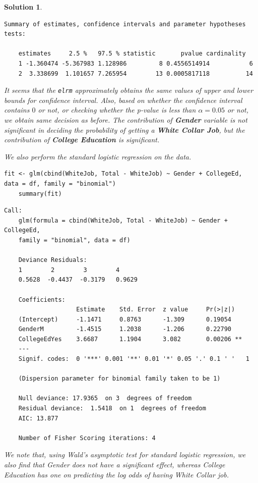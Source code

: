 \documentclass[12pt]{article}
\theoremstyle{problemstyle}
\newtheorem*{solution*}{Solution}
\begin{document}
\begin{solution*}
\begin{lstlisting}[style = R-output]
	Summary of estimates, confidence intervals and parameter hypotheses tests:
	
	estimates     2.5 %   97.5 % statistic       pvalue cardinality
	1 -1.360474 -5.367983 1.128986         8 0.4556514914           6
	2  3.338699  1.101657 7.265954        13 0.0005817118          14
\end{lstlisting}

It seems that the \texttt{elrm} approximately obtains the same values of upper and lower bounds for confidence interval. Also, based on whether the confidence interval contains $0$ or not, or checking whether the p-value is less than $\alpha = 0.05$ or not, we obtain same decision as before. The contribution of \textbf{Gender} variable is not significant in deciding the probability of getting a \textbf{White Collar Job}, but the contribution of \textbf{College Education} is significant. 



We also perform the standard logistic regression on the data.

\begin{lstlisting}[style = R-code]
	fit <- glm(cbind(WhiteJob, Total - WhiteJob) ~ Gender + CollegeEd, data = df, family = "binomial")
	summary(fit)
\end{lstlisting}

\begin{lstlisting}[style = R-output]
	Call:
	glm(formula = cbind(WhiteJob, Total - WhiteJob) ~ Gender + CollegeEd, 
	family = "binomial", data = df)
	
	Deviance Residuals: 
	1        2        3        4  
	0.5628  -0.4437  -0.3179   0.9629  
	
	Coefficients:
					Estimate 	Std. Error 	z value 	Pr(>|z|)   
	(Intercept)   	-1.1471     0.8763  	-1.309  	0.19054   
	GenderM       	-1.4515     1.2038  	-1.206  	0.22790   
	CollegeEdYes   	3.6687     	1.1904   	3.082  		0.00206 **
	---
	Signif. codes:  0 '***' 0.001 '**' 0.01 '*' 0.05 '.' 0.1 ' '   1
		
	(Dispersion parameter for binomial family taken to be 1)
	
	Null deviance: 17.9365  on 3  degrees of freedom
	Residual deviance:  1.5418  on 1  degrees of freedom
	AIC: 13.877
	
	Number of Fisher Scoring iterations: 4
\end{lstlisting}

We note that, using Wald's asymptotic test for standard logistic regression, we also find that Gender does not have a significant effect, whereas College Education has one on predicting the log odds of having White Collar job.




\end{solution*}
\end{document}
